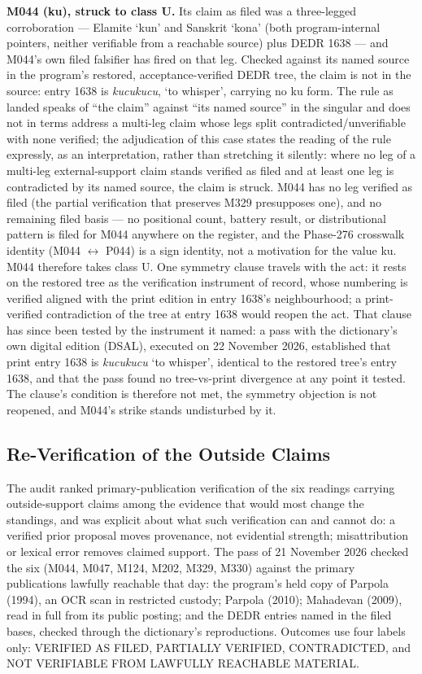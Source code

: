 \documentclass[11pt]{article}
\newcounter{none} %
\begin{document}
\textbf{M044 (ku), struck to class U.} Its claim as filed was a
three-legged corroboration --- Elamite `kun' and Sanskrit
`kona' (both program-internal pointers, neither verifiable from
a reachable source) plus DEDR 1638 --- and M044's own filed
falsifier has fired on that leg. Checked against its named source in the program's
restored, acceptance-verified DEDR tree, the claim is not in the
source: entry 1638 is \emph{kucukucu}, `to whisper', carrying no
ku form. The rule as landed speaks of ``the claim'' against
``its named source'' in the singular and does not in terms
address a multi-leg claim whose legs split
contradicted/unverifiable with none verified; the adjudication
of this case states the reading of the rule expressly, as an
interpretation, rather than stretching it silently: where no leg
of a multi-leg external-support claim stands verified as filed
and at least one leg is contradicted by its named source, the
claim is struck. M044 has no leg verified as filed (the partial
verification that preserves M329 presupposes one), and no
remaining filed basis --- no positional count, battery result,
or distributional pattern is filed for M044 anywhere on the
register, and the Phase-276 crosswalk identity (M044
$\leftrightarrow$ P044) is a sign identity, not a motivation for
the value ku. M044 therefore takes class U. One symmetry clause
travels with the act: it rests on the restored tree as the
verification instrument of record, whose numbering is verified
aligned with the print edition in entry 1638's neighbourhood; a
print-verified contradiction of the tree at entry 1638 would
reopen the act. That clause has since been tested by the
instrument it named: a pass with the dictionary's own digital
edition (DSAL), executed on 22 November 2026, established that
print entry 1638 is \emph{kucukucu} `to whisper', identical to
the restored tree's entry 1638, and that the pass found no
tree-vs-print divergence at any point it tested. The clause's
condition is therefore not met, the symmetry objection is not
reopened, and M044's strike stands undisturbed by it.

\subsection{Re-Verification of the Outside
Claims}\label{appendix-d4-reverification}

The audit ranked primary-publication verification of the six
readings carrying outside-support claims among the evidence that
would most change the standings, and was explicit about what
such verification can and cannot do: a verified prior proposal
moves provenance, not evidential strength; misattribution or
lexical error removes claimed support. The pass of 21 November
2026 checked the six (M044, M047, M124, M202, M329, M330)
against the primary publications lawfully reachable that day:
the program's held copy of Parpola (1994), an OCR scan in
restricted custody; Parpola (2010); Mahadevan (2009), read in
full from its public posting; and the DEDR entries named in the
filed bases, checked through the dictionary's reproductions.
Outcomes use four labels only: VERIFIED AS FILED, PARTIALLY
VERIFIED, CONTRADICTED, and NOT VERIFIABLE FROM LAWFULLY
REACHABLE MATERIAL.
\end{document}
